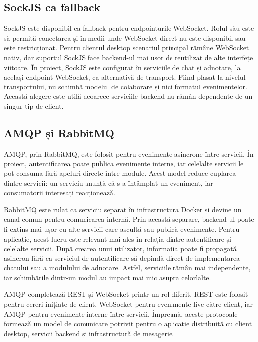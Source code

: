 \subsection{SockJS ca fallback}
\label{subsec:sockjs}

SockJS este disponibil ca fallback pentru endpointurile WebSocket.
Rolul său este să permită conectarea și în medii unde WebSocket direct nu este disponibil sau este restricționat.
Pentru clientul desktop scenariul principal rămâne WebSocket nativ, dar suportul SockJS face backend-ul mai ușor de reutilizat de alte interfețe viitoare.
În proiect, SockJS este configurat în serviciile de chat și adnotare, la același endpoint WebSocket, ca alternativă de transport.
Fiind plasat la nivelul transportului, nu schimbă modelul de colaborare și nici formatul evenimentelor.
Această alegere este utilă deoarece serviciile backend nu rămân dependente de un singur tip de client.

\subsection{AMQP și RabbitMQ}
\label{subsec:amqp-rabbitmq}

AMQP, prin RabbitMQ, este folosit pentru evenimente asincrone între servicii.
În proiect, autentificarea poate publica evenimente interne, iar celelalte servicii le pot consuma fără apeluri directe între module.
Acest model reduce cuplarea dintre servicii: un serviciu anunță că s-a întâmplat un eveniment, iar consumatorii interesați reacționează.

RabbitMQ este rulat ca serviciu separat în infrastructura Docker și devine un canal comun pentru comunicarea internă.
Prin această separare, backend-ul poate fi extins mai ușor cu alte servicii care ascultă sau publică evenimente.
Pentru aplicație, acest lucru este relevant mai ales în relația dintre autentificare și celelalte servicii.
După crearea unui utilizator, informația poate fi propagată asincron fără ca serviciul de autentificare să depindă direct de implementarea chatului sau a modulului de adnotare.
Astfel, serviciile rămân mai independente, iar schimbările dintr-un modul au impact mai mic asupra celorlalte.

AMQP completează REST și WebSocket printr-un rol diferit.
REST este folosit pentru cereri inițiate de client, WebSocket pentru evenimente live către client, iar AMQP pentru evenimente interne între servicii.
Împreună, aceste protocoale formează un model de comunicare potrivit pentru o aplicație distribuită cu client desktop, servicii backend și infrastructură de mesagerie.

